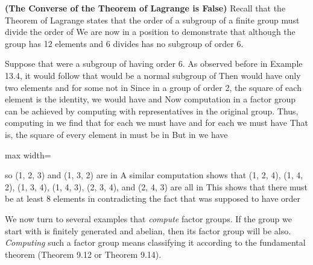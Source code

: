 \documentclass[11pt,oneside]{article}
\begin{document}
\begin{BookBody}

 \textbf{(The Converse of the Theorem of Lagrange is False)} Recall that the Theorem of Lagrange states that the order of a subgroup of a finite group  must divide the order of  We are now in a position to demonstrate that although the group  has 12 elements and 6 divides  has no subgroup of order 6.

Suppose that  were a subgroup of  having order 6. As observed before in Example 13.4, it would follow that  would be a normal subgroup of  Then  would have only two elements and  for some  not in  Since in a group of order 2, the square of each element is the identity, we would have  and  Now computation in a factor group can be achieved by computing with representatives in the original group. Thus, computing in  we find that for each  we must have  and for each  we must have  That is, the square of every element in  must be in  But in  we have

\begin{center}\begin{adjustbox}{max width=\linewidth}\end{adjustbox}\end{center}

\noindent so (1, 2, 3) and (1, 3, 2) are in  A similar computation shows that (1, 2, 4), (1, 4, 2), (1, 3, 4), (1, 4, 3), (2, 3, 4), and (2, 4, 3) are all in  This shows that there must be at least 8 elements in  contradicting the fact that  was supposed to have order \BookEnd{\blacktriangle}

We now turn to several examples that\textit{ compute} factor groups. If the group we start with is finitely generated and abelian, then its factor group will be also.\textit{ Computing} such a factor group means classifying it according to the fundamental theorem (Theorem 9.12 or Theorem 9.14).


\end{BookBody}
\end{document}
